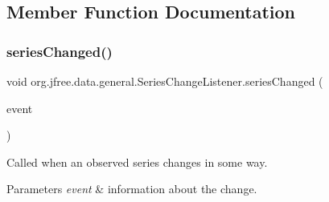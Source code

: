 \subsection{Member Function Documentation}
\mbox{\label{interfaceorg_1_1jfree_1_1data_1_1general_1_1_series_change_listener_a441fd65d1290b91e0184124be928ebf7}} 
\subsubsection{\texorpdfstring{series\+Changed()}{seriesChanged()}}
{\footnotesize\ttfamily void org.\+jfree.\+data.\+general.\+Series\+Change\+Listener.\+series\+Changed (\begin{DoxyParamCaption}\item[{\mbox{\hyperlink{classorg_1_1jfree_1_1data_1_1general_1_1_series_change_event}{Series\+Change\+Event}}}]{event }\end{DoxyParamCaption})}

Called when an observed series changes in some way.


\begin{DoxyParams}{Parameters}
{\em event} & information about the change. \\
\hline
\end{DoxyParams}


